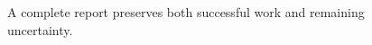\begin{figure}[H]
\centering
{}
\caption{A complete report preserves both successful work and remaining uncertainty.}\label{fig:teach-M06-22}
\end{figure}
